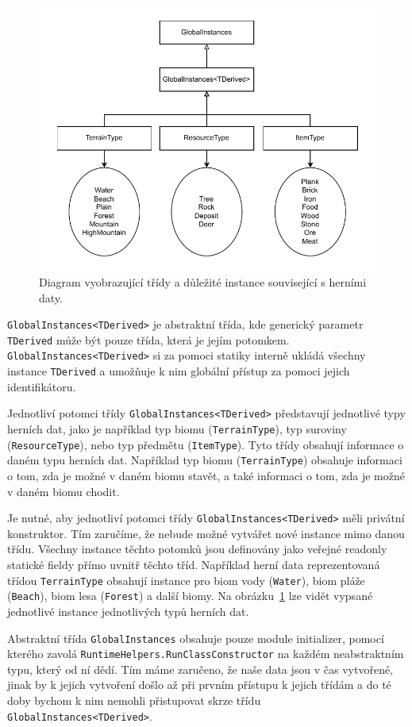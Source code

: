 \begin{figure}[!htb]
  \centering
  \includegraphics[width=0.7\linewidth]{img/game-data.pdf}
  \caption{Diagram vyobrazující třídy a důležité instance související s herními daty.}
  \label{fig:game-data}
\end{figure}

\texttt{GlobalInstances<TDerived>} je abstraktní třída, kde generický parametr \texttt{TDerived} může být pouze třída, která je jejím potomkem. \texttt{GlobalInstances<TDerived>} si za pomoci statiky interně ukládá všechny instance \texttt{TDerived} a umožňuje k nim globální přístup za pomoci jejich identifikátoru.

Jednotliví potomci třídy \texttt{GlobalInstances<TDerived>} představují jednotlivé typy herních dat, jako je například typ biomu (\texttt{TerrainType}), typ suroviny (\texttt{ResourceType}), nebo typ předmětu (\texttt{ItemType}). Tyto třídy obsahují informace o daném typu herních dat. Například typ biomu (\texttt{TerrainType}) obsahuje informaci o tom, zda je možné v daném biomu stavět, a také informaci o tom, zda je možné v daném biomu chodit.

Je nutné, aby jednotliví potomci třídy \texttt{GlobalInstances<TDerived>} měli privátní konstruktor. Tím zaručíme, že nebude možné vytvářet nové instance mimo danou třídu. Všechny instance těchto potomků jsou definovány jako veřejné readonly statické fieldy přímo uvnitř těchto tříd.  Například herní data reprezentovaná třídou \texttt{TerrainType} obsahují instance pro biom vody (\texttt{Water}), biom pláže (\texttt{Beach}), biom lesa (\texttt{Forest}) a další biomy. Na obrázku~\ref{fig:game-data} lze vidět vypsané jednotlivé instance jednotlivých typů herních dat.

Abstraktní třída \texttt{GlobalInstances} obsahuje pouze module initializer, pomocí kterého zavolá \texttt{RuntimeHelpers.RunClassConstructor} na každém neabstraktním typu, který od ní dědí. Tím máme zaručeno, že naše data jsou v čas vytvořené, jinak by k jejich vytvoření došlo až při prvním přístupu k jejich třídám a do té doby bychom k nim nemohli přistupovat skrze třídu \texttt{GlobalInstances<TDerived>}.

